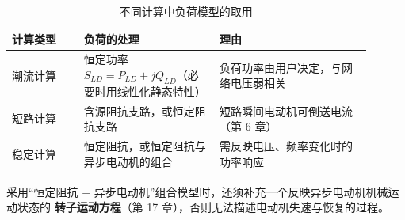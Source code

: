 \begin{table}[htbp]
  \centering
  \caption{不同计算中负荷模型的取用}
  \small
  \begin{tabular}{@{}p{0.18\linewidth}p{0.34\linewidth}p{0.38\linewidth}@{}}
    \toprule
    计算类型 & 负荷的处理 & 理由 \\
    \midrule
    潮流计算 & 恒定功率 $S_{LD}=P_{LD}+jQ_{LD}$（必要时用线性化静态特性） & 负荷功率由用户决定，与网络电压弱相关 \\
    短路计算 & 含源阻抗支路，或恒定阻抗支路 & 短路瞬间电动机可倒送电流（第 6 章） \\
    稳定计算 & 恒定阻抗，或恒定阻抗与异步电动机的组合 & 需反映电压、频率变化时的功率响应 \\
    \bottomrule
  \end{tabular}
\end{table}

采用“恒定阻抗 $+$ 异步电动机”组合模型时，还须补充一个反映异步电动机机械运动状态的
\textbf{转子运动方程}（第 17 章），否则无法描述电动机失速与恢复的过程。

